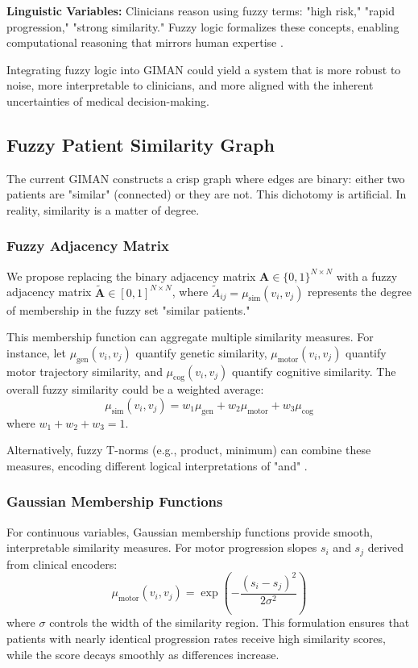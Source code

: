 \documentclass[conference]{IEEEtran}
\begin{document}
\textbf{Linguistic Variables:} Clinicians reason using fuzzy terms: "high risk," "rapid progression," "strong similarity." Fuzzy logic formalizes these concepts, enabling computational reasoning that mirrors human expertise \cite{torres2006fuzzy}.

Integrating fuzzy logic into GIMAN could yield a system that is more robust to noise, more interpretable to clinicians, and more aligned with the inherent uncertainties of medical decision-making.

\subsection{Fuzzy Patient Similarity Graph}

The current GIMAN constructs a crisp graph where edges are binary: either two patients are "similar" (connected) or they are not. This dichotomy is artificial. In reality, similarity is a matter of degree.

\subsubsection{Fuzzy Adjacency Matrix}
We propose replacing the binary adjacency matrix $\mathbf{A} \in \{0,1\}^{N \times N}$ with a fuzzy adjacency matrix $\tilde{\mathbf{A}} \in [0,1]^{N \times N}$, where $\tilde{A}_{ij} = \mu_{\text{sim}}(v_i, v_j)$ represents the degree of membership in the fuzzy set "similar patients."

This membership function can aggregate multiple similarity measures. For instance, let $\mu_{\text{gen}}(v_i, v_j)$ quantify genetic similarity, $\mu_{\text{motor}}(v_i, v_j)$ quantify motor trajectory similarity, and $\mu_{\text{cog}}(v_i, v_j)$ quantify cognitive similarity. The overall fuzzy similarity could be a weighted average:
\begin{equation}
\mu_{\text{sim}}(v_i, v_j) = w_1\mu_{\text{gen}} + w_2\mu_{\text{motor}} + w_3\mu_{\text{cog}}
\end{equation}
where $w_1 + w_2 + w_3 = 1$.

Alternatively, fuzzy T-norms (e.g., product, minimum) can combine these measures, encoding different logical interpretations of "and" \cite{klement2013triangular}.

\subsubsection{Gaussian Membership Functions}
For continuous variables, Gaussian membership functions provide smooth, interpretable similarity measures. For motor progression slopes $s_i$ and $s_j$ derived from clinical encoders:
\begin{equation}
\mu_{\text{motor}}(v_i, v_j) = \exp\left(-\frac{(s_i - s_j)^2}{2\sigma^2}\right)
\end{equation}
where $\sigma$ controls the width of the similarity region. This formulation ensures that patients with nearly identical progression rates receive high similarity scores, while the score decays smoothly as differences increase.
\end{document}
